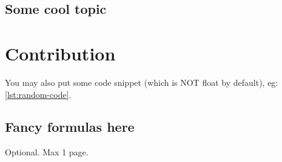 \documentclass[12pt,a4paper,openright,twoside]{book}
\begin{document}
\section{Some cool topic}

\chapter{Contribution}

You may also put some code snippet (which is NOT float by default), eg: \cref{lst:random-code}.



\section{Fancy formulas here}


\backmatter

\nocite{*} %




\begin{acknowledgements} %
Optional. Max 1 page.
\end{acknowledgements}
\end{document}
